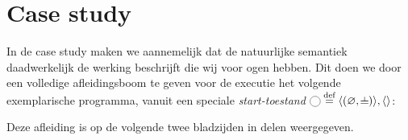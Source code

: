 
\chapter{Case study}

In de case study maken we aannemelijk dat de natuurlijke semantiek daadwerkelijk de werking beschrijft die wij voor ogen hebben. Dit doen we door een volledige afleidingsboom te geven voor de executie het volgende exemplarische programma, vanuit een speciale \emph{start-toestand} $\State{\phantom{A}} \DEF \langle(\varnothing, \nil)\rangle, \langle\rangle$:

\newCodeFragment
\begin{minipage}{.5\textwidth}
\end{minipage}
\begin{minipage}{.5\textwidth}
\end{minipage}

Deze afleiding is op de volgende twee bladzijden in delen weergegeven.

